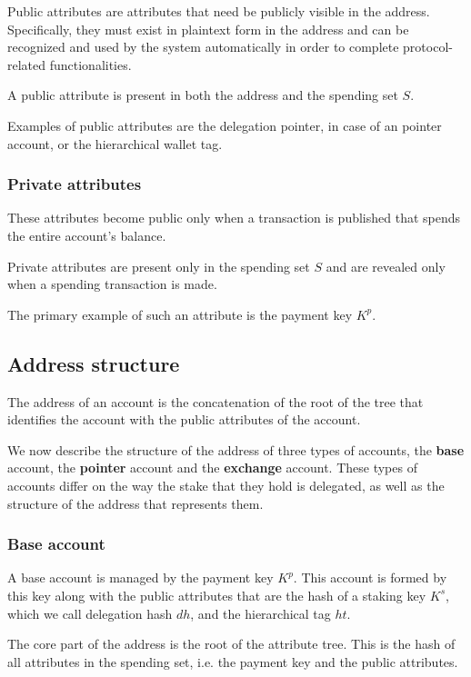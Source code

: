 Public attributes are attributes that need be publicly visible in the address. Specifically, they must exist in plaintext form in the address and can be recognized and used by the system automatically in order to complete protocol-related functionalities.

A public attribute is present in both the address and the spending set $S$.

Examples of public attributes are the delegation pointer, in case of an pointer account, or the hierarchical wallet tag.

\subsubsection{Private attributes}

These attributes become public only when a transaction is published that spends the entire account's balance.

Private attributes are present only in the spending set $S$ and are revealed only when a spending transaction is made.

The primary example of such an attribute is the payment key $K^p$.

\subsection{Address structure}

The address of an account is the concatenation of the root of the tree that identifies the account with the public attributes of the account.

We now describe the structure of the address of three types of accounts, the \textbf{base} account, the \textbf{pointer} account and the \textbf{exchange} account. These types of accounts differ on the way the stake that they hold is delegated, as well as the structure of the address that represents them.

\subsubsection{Base account}\label{subsubsec:base_account_v2}

A base account is managed by the payment key $K^p$. This account is formed by this key along with the public attributes that are the hash of a staking key $K^s$, which we call delegation hash $dh$, and the hierarchical tag $ht$.

The core part of the address is the root of the attribute tree. This is the hash of all attributes in the spending set, i.e. the payment key and the public attributes.

